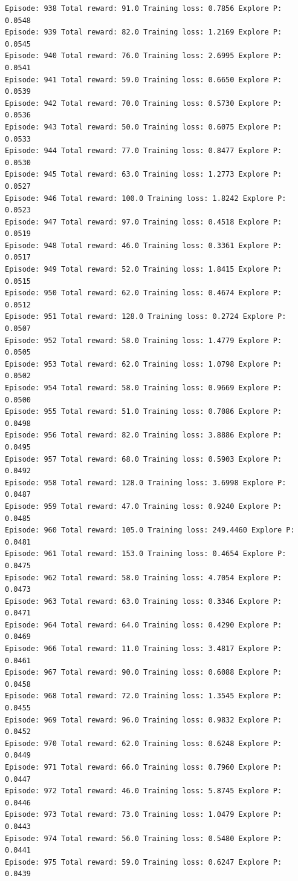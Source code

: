 \documentclass[11pt]{article}
\begin{document}
\begin{Verbatim}[commandchars=\\\{\}]
Episode: 938 Total reward: 91.0 Training loss: 0.7856 Explore P: 0.0548
Episode: 939 Total reward: 82.0 Training loss: 1.2169 Explore P: 0.0545
Episode: 940 Total reward: 76.0 Training loss: 2.6995 Explore P: 0.0541
Episode: 941 Total reward: 59.0 Training loss: 0.6650 Explore P: 0.0539
Episode: 942 Total reward: 70.0 Training loss: 0.5730 Explore P: 0.0536
Episode: 943 Total reward: 50.0 Training loss: 0.6075 Explore P: 0.0533
Episode: 944 Total reward: 77.0 Training loss: 0.8477 Explore P: 0.0530
Episode: 945 Total reward: 63.0 Training loss: 1.2773 Explore P: 0.0527
Episode: 946 Total reward: 100.0 Training loss: 1.8242 Explore P: 0.0523
Episode: 947 Total reward: 97.0 Training loss: 0.4518 Explore P: 0.0519
Episode: 948 Total reward: 46.0 Training loss: 0.3361 Explore P: 0.0517
Episode: 949 Total reward: 52.0 Training loss: 1.8415 Explore P: 0.0515
Episode: 950 Total reward: 62.0 Training loss: 0.4674 Explore P: 0.0512
Episode: 951 Total reward: 128.0 Training loss: 0.2724 Explore P: 0.0507
Episode: 952 Total reward: 58.0 Training loss: 1.4779 Explore P: 0.0505
Episode: 953 Total reward: 62.0 Training loss: 1.0798 Explore P: 0.0502
Episode: 954 Total reward: 58.0 Training loss: 0.9669 Explore P: 0.0500
Episode: 955 Total reward: 51.0 Training loss: 0.7086 Explore P: 0.0498
Episode: 956 Total reward: 82.0 Training loss: 3.8886 Explore P: 0.0495
Episode: 957 Total reward: 68.0 Training loss: 0.5903 Explore P: 0.0492
Episode: 958 Total reward: 128.0 Training loss: 3.6998 Explore P: 0.0487
Episode: 959 Total reward: 47.0 Training loss: 0.9240 Explore P: 0.0485
Episode: 960 Total reward: 105.0 Training loss: 249.4460 Explore P: 0.0481
Episode: 961 Total reward: 153.0 Training loss: 0.4654 Explore P: 0.0475
Episode: 962 Total reward: 58.0 Training loss: 4.7054 Explore P: 0.0473
Episode: 963 Total reward: 63.0 Training loss: 0.3346 Explore P: 0.0471
Episode: 964 Total reward: 64.0 Training loss: 0.4290 Explore P: 0.0469
Episode: 966 Total reward: 11.0 Training loss: 3.4817 Explore P: 0.0461
Episode: 967 Total reward: 90.0 Training loss: 0.6088 Explore P: 0.0458
Episode: 968 Total reward: 72.0 Training loss: 1.3545 Explore P: 0.0455
Episode: 969 Total reward: 96.0 Training loss: 0.9832 Explore P: 0.0452
Episode: 970 Total reward: 62.0 Training loss: 0.6248 Explore P: 0.0449
Episode: 971 Total reward: 66.0 Training loss: 0.7960 Explore P: 0.0447
Episode: 972 Total reward: 46.0 Training loss: 5.8745 Explore P: 0.0446
Episode: 973 Total reward: 73.0 Training loss: 1.0479 Explore P: 0.0443
Episode: 974 Total reward: 56.0 Training loss: 0.5480 Explore P: 0.0441
Episode: 975 Total reward: 59.0 Training loss: 0.6247 Explore P: 0.0439

\end{Verbatim}
\end{document}
